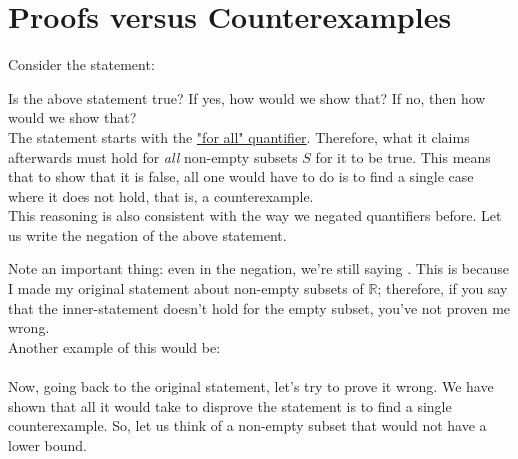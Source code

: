 \section{Proofs versus Counterexamples}\label{sec:pvsce}
Consider the statement:
\begin{center}
\end{center}
Is the above statement true? If yes, how would we show that? If no, then how would we show that?\\
The statement starts with the \hyperref[ssec:univquant]{"for all" quantifier}. Therefore, what it claims afterwards must hold for \textit{all} non-empty subsets $S$ for it to be true. This means that to show that it is false, all one would have to do is to find a single case where it does not hold, that is, a counterexample.\\
This reasoning is also consistent with the way we negated quantifiers before. Let us write the negation of the above statement.
\begin{center}
\end{center}
Note an important thing: even in the negation, we're still saying . This is because I made my original statement about non-empty subsets of $\mathbb{R}$; therefore, if you say that the inner-statement doesn't hold for the empty subset, you've not proven me wrong.\\
Another example of this would be:\\
\\
Now, going back to the original statement, let's try to prove it wrong. We have shown that all it would take to disprove the statement is to find a single counterexample. So, let us think of a non-empty subset that would not have a lower bound.\\~\\
